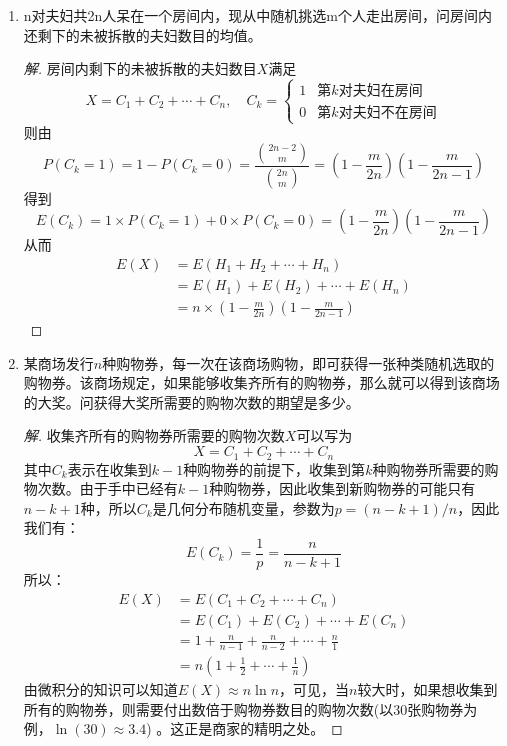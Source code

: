 \documentclass[12pt]{article}
\newcommand{\hei}{\CJKfamily{hei}}                          %
\begin{document}
\begin{enumerate}
\item {\hei n对夫妇共2n人呆在一个房间内，现从中随机挑选m个人走出房间，问房间内还剩下的未被拆散的夫妇数目的均值。}
\begin{proof}[解]
	房间内剩下的未被拆散的夫妇数目$X$满足
	\begin{equation}
	X=C_1+C_2+\cdots+C_n,\quad C_k=\left\{
	\begin{array}{cc}
	1 & \mbox{第$k$对夫妇在房间}\\
	0 & \mbox{第$k$对夫妇不在房间}
	\end{array}
	\right.
	\end{equation}
	则由\begin{equation}
	P(C_k=1)=1-P(C_k=0)=\frac{\binom{2n-2}{m}}{\binom{2n}{m}}=\left(1-\frac{m}{2n}\right)\left(1-\frac{m}{2n-1}\right)
	\end{equation}
	得到\begin{equation}
	E(C_k)=1\times P(C_k=1)+0\times P(C_k=0)=\left(1-\frac{m}{2n}\right)\left(1-\frac{m}{2n-1}\right)
	\end{equation}
	从而\begin{equation}
	\begin{aligned}
	E(X)&=E(H_1+H_2+\cdots+H_n)\\
	&=E(H_1)+E(H_2)+\cdots+E(H_n) \\
	&=n\times \left(1-\frac{m}{2n}\right)\left(1-\frac{m}{2n-1}\right)
	\end{aligned}
	\end{equation}
\end{proof}

\item {\hei 某商场发行$n$种购物券，每一次在该商场购物，即可获得一张种类随机选取的购物券。该商场规定，如果能够收集齐所有的购物券，那么就可以得到该商场的大奖。问获得大奖所需要的购物次数的期望是多少。}

\begin{proof}[解]
	收集齐所有的购物券所需要的购物次数$X$可以写为
	\begin{equation}
	X=C_1+C_2+\cdots+C_n
	\end{equation}
	其中$C_k$表示在收集到$k-1$种购物券的前提下，收集到第$k$种购物券所需要的购物次数。由于手中已经有$k-1$种购物券，因此收集到新购物券的可能只有$n-k+1$种，所以$C_k$是几何分布随机变量，参数为$p=(n-k+1)/n$，因此我们有：
	\begin{equation}
	E(C_k)=\frac{1}{p}=\frac{n}{n-k+1}
	\end{equation}
	所以：
	\begin{equation}
	\begin{aligned}
	E(X)&=E(C_1+C_2+\cdots+C_n)\\
	&=E(C_1)+E(C_2)+\cdots+E(C_n) \\
	&=1+\frac{n}{n-1}+\frac{n}{n-2}+\cdots+\frac{n}{1} \\
	&=n\left(1+\frac{1}{2}+\cdots+\frac{1}{n}\right)
	\end{aligned}
	\end{equation}
	由微积分的知识可以知道$E(X)\approx n\ln n$，可见，当$n$较大时，如果想收集到所有的购物券，则需要付出数倍于购物券数目的购物次数(以30张购物券为例，$\ln(30)\approx3.4$) 。这正是商家的精明之处。
\end{proof}


\end{enumerate}
\end{document}
